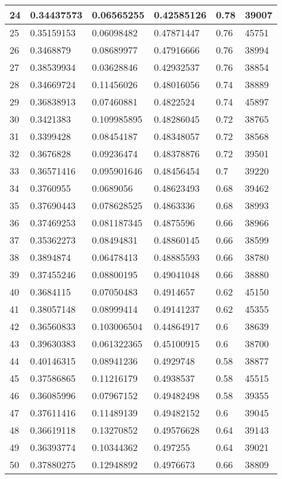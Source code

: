 \begin{longtable}{|l|l|l|l|l|l|}
24 & 0.34437573 & 0.06565255 & 0.42585126 & 0.78 & 39007 \\ \hline 
25 & 0.35159153 & 0.06098482 & 0.47871447 & 0.76 & 45751 \\ \hline 
26 & 0.3468879 & 0.08689977 & 0.47916666 & 0.76 & 38994 \\ \hline 
27 & 0.38539934 & 0.03628846 & 0.42932537 & 0.76 & 38854 \\ \hline 
28 & 0.34669724 & 0.11456026 & 0.48016056 & 0.74 & 38889 \\ \hline 
29 & 0.36838913 & 0.07460881 & 0.4822524 & 0.74 & 45897 \\ \hline 
30 & 0.3421383 & 0.109985895 & 0.48286045 & 0.72 & 38765 \\ \hline 
31 & 0.3399428 & 0.08454187 & 0.48348057 & 0.72 & 38568 \\ \hline 
32 & 0.3676828 & 0.09236474 & 0.48378876 & 0.72 & 39501 \\ \hline 
33 & 0.36571416 & 0.095901646 & 0.48456454 & 0.7 & 39220 \\ \hline 
34 & 0.3760955 & 0.0689056 & 0.48623493 & 0.68 & 39462 \\ \hline 
35 & 0.37690443 & 0.078628525 & 0.4863336 & 0.68 & 38993 \\ \hline 
36 & 0.37469253 & 0.081187345 & 0.4875596 & 0.66 & 38966 \\ \hline 
37 & 0.35362273 & 0.08494831 & 0.48860145 & 0.66 & 38599 \\ \hline 
38 & 0.3894874 & 0.06478413 & 0.48885593 & 0.66 & 38780 \\ \hline 
39 & 0.37455246 & 0.08800195 & 0.49041048 & 0.66 & 38880 \\ \hline 
40 & 0.3684115 & 0.07050483 & 0.4914657 & 0.62 & 45150 \\ \hline 
41 & 0.38057148 & 0.08999414 & 0.49141237 & 0.62 & 45355 \\ \hline 
42 & 0.36560833 & 0.103006504 & 0.44864917 & 0.6 & 38639 \\ \hline 
43 & 0.39630383 & 0.061322365 & 0.45100915 & 0.6 & 38700 \\ \hline 
44 & 0.40146315 & 0.08941236 & 0.4929748 & 0.58 & 38877 \\ \hline 
45 & 0.37586865 & 0.11216179 & 0.4938537 & 0.58 & 45515 \\ \hline 
46 & 0.36085996 & 0.07967152 & 0.49482498 & 0.58 & 39355 \\ \hline 
47 & 0.37611416 & 0.11489139 & 0.49482152 & 0.6 & 39045 \\ \hline 
48 & 0.36619118 & 0.13270852 & 0.49576628 & 0.64 & 39143 \\ \hline 
49 & 0.36393774 & 0.10344362 & 0.497255 & 0.64 & 39021 \\ \hline 
50 & 0.37880275 & 0.12948892 & 0.4976673 & 0.66 & 38809 \\ \hline 
\end{longtable}